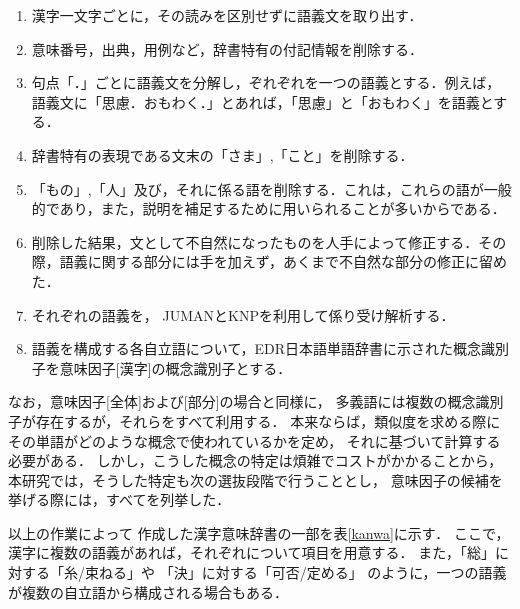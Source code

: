   \begin{enumerate}
   \item 漢字一文字ごとに，その読みを区別せずに語義文を取り出す．
   \item 意味番号，出典，用例など，辞書特有の付記情報を削除する．
   \item 句点「．」ごとに語義文を分解し，ぞれぞれを一つの語義とする．例えば，語義文に「思慮．おもわく．」とあれば，「思慮」と「おもわく」を語義とする．
   \item 辞書特有の表現である文末の「さま」,「こと」を削除する．
   \item 「もの」,「人」及び，それに係る語を削除する．これは，これらの語が一般的であり，また，説明を補足するために用いられることが多いからである．
   \item 削除した結果，文として不自然になったものを人手によって修正する．その際，語義に関する部分には手を加えず，あくまで不自然な部分の修正に留めた．
   \item それぞれの語義を，
	 JUMANとKNPを利用して係り受け解析する．
   \item 語義を構成する各自立語について，EDR日本語単語辞書\cite{edrdic}に示された概念識別子を意味因子[漢字]の概念識別子とする．
  \end{enumerate}
なお，意味因子[全体]および[部分]の場合と同様に，
多義語には複数の概念識別子が存在するが，それらをすべて利用する．
本来ならば，類似度を求める際に
その単語がどのような概念で使われているかを定め，
それに基づいて計算する必要がある．
しかし，こうした概念の特定は煩雑でコストがかかることから，
本研究では，そうした特定も次の選抜段階で行うこととし，
意味因子の候補を挙げる際には，すべてを列挙した．

以上の作業によって
作成した漢字意味辞書の一部を表\ref{kanwa}に示す．
ここで，漢字に複数の語義があれば，それぞれについて項目を用意する．
また，「総」に対する「糸/束ねる」や
「決」に対する「可否/定める」
のように，一つの語義が複数の自立語から構成される場合もある．

